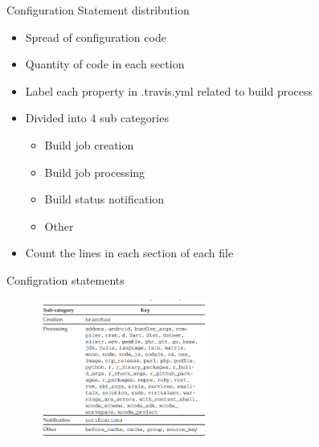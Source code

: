 \documentclass[aspectratio=169,xcolor=dvipsnames]{beamer}
\begin{document}
\begin{frame}{Configuration Statement distribution}
    \begin{itemize}
        \item Spread of configuration code
        \item Quantity of code in each section
        \item Label each property in .travis.yml related to build process
        \item Divided into 4 sub categories
        \begin{itemize}
            \item Build job creation
            \item Build job processing
            \item Build status notification
            \item Other 
        \end{itemize}
        \item Count the lines in each section of each file
    \end{itemize}
\end{frame}
\begin{frame}{Configration statements}
    \begin{figure}
        \centering
        \includegraphics[width=0.5\textwidth]{images/Section-Labels.png}
        \label{fig:my_label}
    \end{figure}
\end{frame}
\end{document}
